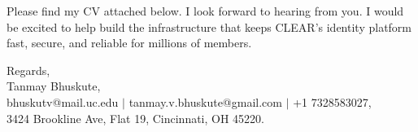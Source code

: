 \documentclass[11pt]{letter}
\begin{document}
\begin{letter}{}
Please find my CV attached below. I look forward to hearing from you. I would be excited to help build the infrastructure that keeps CLEAR's identity platform fast, secure, and reliable for millions of members.

{\setlength{\parskip}{0pt}
Regards,\\
Tanmay Bhuskute,\\
bhuskutv@mail.uc.edu $\mid$ tanmay.v.bhuskute@gmail.com $\mid$ +1 7328583027,\\
3424 Brookline Ave, Flat 19, Cincinnati, OH 45220.
}

\end{letter}
\end{document}
